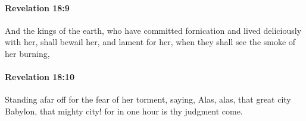 		\paragraph{Revelation 18:9} %
			\label{REVELATIONNT-18-9}

			And the kings of the earth, who have committed fornication and lived deliciously with her, shall bewail her, and lament for her, when they shall see the smoke of her burning,

			\begin{framed}
			\scriptsize
				\begin{compactdesc}
					\item[SBLG] 
				\end{compactdesc}
			\end{framed}

		\paragraph{Revelation 18:10} %
			\label{REVELATIONNT-18-10}

			Standing afar off for the fear of her torment, saying, Alas, alas, that great city Babylon, that mighty city! for in one hour is thy judgment come.

